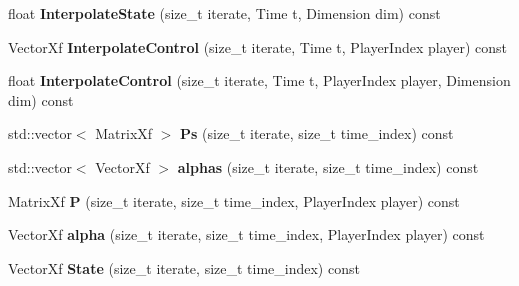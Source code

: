 \begin{DoxyCompactItemize}
\item 
float {\bfseries Interpolate\+State} (size\+\_\+t iterate, Time t, Dimension dim) const \hypertarget{classilqgames_1_1_solver_log_ac81714a5caf9e2f497ed04b58e333757}{}\label{classilqgames_1_1_solver_log_ac81714a5caf9e2f497ed04b58e333757}

\item 
Vector\+Xf {\bfseries Interpolate\+Control} (size\+\_\+t iterate, Time t, Player\+Index player) const \hypertarget{classilqgames_1_1_solver_log_ac7d6053a5764889fca2ec5cf5a462988}{}\label{classilqgames_1_1_solver_log_ac7d6053a5764889fca2ec5cf5a462988}

\item 
float {\bfseries Interpolate\+Control} (size\+\_\+t iterate, Time t, Player\+Index player, Dimension dim) const \hypertarget{classilqgames_1_1_solver_log_af8fd1063450f96fa3e5029bc07b5b39b}{}\label{classilqgames_1_1_solver_log_af8fd1063450f96fa3e5029bc07b5b39b}

\item 
std\+::vector$<$ Matrix\+Xf $>$ {\bfseries Ps} (size\+\_\+t iterate, size\+\_\+t time\+\_\+index) const \hypertarget{classilqgames_1_1_solver_log_a5429c067fefb9d902be11cb881247a81}{}\label{classilqgames_1_1_solver_log_a5429c067fefb9d902be11cb881247a81}

\item 
std\+::vector$<$ Vector\+Xf $>$ {\bfseries alphas} (size\+\_\+t iterate, size\+\_\+t time\+\_\+index) const \hypertarget{classilqgames_1_1_solver_log_ae4725b1be8df5cb17312e8bb27bf1954}{}\label{classilqgames_1_1_solver_log_ae4725b1be8df5cb17312e8bb27bf1954}

\item 
Matrix\+Xf {\bfseries P} (size\+\_\+t iterate, size\+\_\+t time\+\_\+index, Player\+Index player) const \hypertarget{classilqgames_1_1_solver_log_a0bf49939b8e4b940067bf2157c621c93}{}\label{classilqgames_1_1_solver_log_a0bf49939b8e4b940067bf2157c621c93}

\item 
Vector\+Xf {\bfseries alpha} (size\+\_\+t iterate, size\+\_\+t time\+\_\+index, Player\+Index player) const \hypertarget{classilqgames_1_1_solver_log_a0234745c13f7426545dcf37ef759f7e3}{}\label{classilqgames_1_1_solver_log_a0234745c13f7426545dcf37ef759f7e3}

\item 
Vector\+Xf {\bfseries State} (size\+\_\+t iterate, size\+\_\+t time\+\_\+index) const \hypertarget{classilqgames_1_1_solver_log_a54b12edccfcfca015670cd6405b1b527}{}\label{classilqgames_1_1_solver_log_a54b12edccfcfca015670cd6405b1b527}


\end{DoxyCompactItemize}

